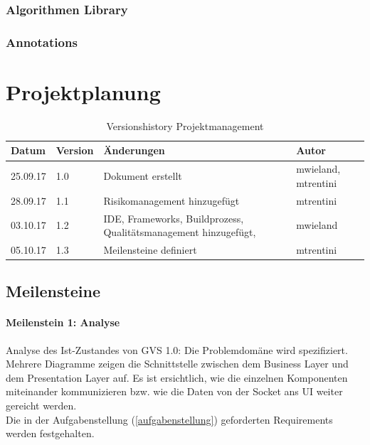 \documentclass[11pt,a4paper,english,oneside]{book}
\numberwithin{equation}{chapter}
\begin{document}
	\subsection{Algorithmen Library}
	
	\subsection{Annotations}
	
	
	
	\chapter{Projektplanung}
	
	
	\begin{table}[h!]
		\centering
		\begin{tabularx}{\linewidth}{l l X l}
			\toprule 
			Datum & Version & Änderungen & Autor \\
			\midrule
			25.09.17 & 1.0 & Dokument erstellt & mwieland, mtrentini \\
			28.09.17 & 1.1 & Risikomanagement hinzugefügt & mtrentini \\
			03.10.17 & 1.2 & IDE, Frameworks, Buildprozess, Qualitätsmanagement hinzugefügt, & mwieland \\
			05.10.17 & 1.3 & Meilensteine definiert & mtrentini \\
			\bottomrule 
		\end{tabularx} 
		\caption{Versionshistory Projektmanagement} 
	\end{table}
	
	\section{Meilensteine}
	\label{sec:milestones}
	
	\subsubsection{Meilenstein 1: Analyse}
	Analyse des Ist-Zustandes von GVS 1.0: Die Problemdomäne wird spezifiziert. Mehrere Diagramme zeigen die Schnittstelle zwischen dem Business Layer und dem Presentation Layer auf. Es ist ersichtlich, wie die einzelnen Komponenten miteinander kommunizieren bzw. wie die Daten von der Socket ans UI weiter gereicht werden.\\
	Die in der Aufgabenstellung (\ref{aufgabenstellung}) geforderten Requirements werden festgehalten.
	
\end{document}
